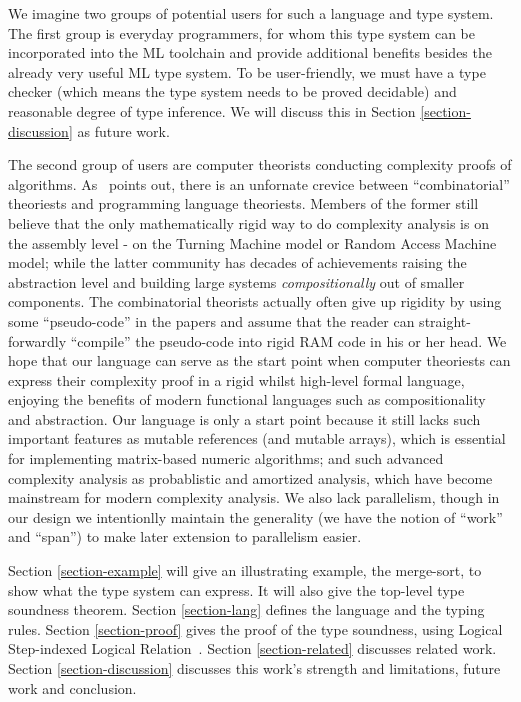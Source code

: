 \documentclass[preprint]{sigplanconf}
\begin{document}
We imagine two groups of potential users for such a language and type system. The first group is everyday programmers, for whom this type system can be incorporated into the ML toolchain and provide additional benefits besides the already very useful ML type system. To be user-friendly, we must have a type checker (which means the type system needs to be proved decidable) and reasonable degree of type inference. We will discuss this in Section \ref{section-discussion} as future work.

The second group of users are computer theorists conducting complexity proofs of algorithms. As~\cite{harper2014proposal} points out, there is an unfornate crevice between ``combinatorial'' theoriests and programming language theoriests. Members of the former still believe that the only mathematically rigid way to do complexity analysis is on the assembly level - on the Turning Machine model or Random Access Machine model; while the latter community has decades of achievements raising the abstraction level and building large systems \emph{compositionally} out of smaller components. The combinatorial theorists actually often give up rigidity by using some ``pseudo-code'' in the papers and assume that the reader can straight-forwardly ``compile'' the pseudo-code into rigid RAM code in his or her head. We hope that our language can serve as the start point when computer theoriests can express their complexity proof in a rigid whilst high-level formal language, enjoying the benefits of modern functional languages such as compositionality and abstraction. Our language is only a start point because it still lacks such important features as mutable references (and mutable arrays), which is essential for implementing matrix-based numeric algorithms; and such advanced complexity analysis as probablistic and amortized analysis, which have become mainstream for modern complexity analysis. We also lack parallelism, though in our design we intentionlly maintain the generality (we have the notion of ``work'' and ``span'') to make later extension to parallelism easier.

Section \ref{section-example} will give an illustrating example, the merge-sort, to show what the type system can express. It will also give the top-level type soundness theorem. Section \ref{section-lang} defines the language and the typing rules. Section \ref{section-proof} gives the proof of the type soundness, using Logical Step-indexed Logical Relation~\cite{dreyer2009logical}. Section \ref{section-related} discusses related work. Section \ref{section-discussion} discusses this work's strength and limitations, future work and conclusion.
\end{document}
